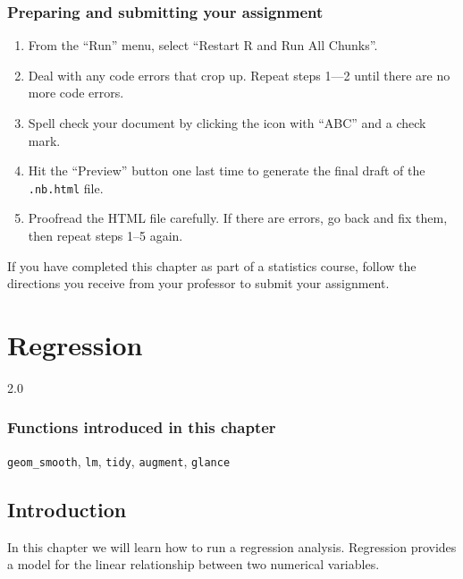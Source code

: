 \documentclass[
]{book}
\providecommand{\tightlist}{%
  \setlength{\itemsep}{0pt}\setlength{\parskip}{0pt}}
\begin{document}
\hypertarget{correlation-prep}{%
\subsection{Preparing and submitting your assignment}\label{correlation-prep}}

\begin{enumerate}
\def\labelenumi{\arabic{enumi}.}
\tightlist
\item
  From the ``Run'' menu, select ``Restart R and Run All Chunks''.
\item
  Deal with any code errors that crop up. Repeat steps 1---2 until there are no more code errors.
\item
  Spell check your document by clicking the icon with ``ABC'' and a check mark.
\item
  Hit the ``Preview'' button one last time to generate the final draft of the \texttt{.nb.html} file.
\item
  Proofread the HTML file carefully. If there are errors, go back and fix them, then repeat steps 1--5 again.
\end{enumerate}

If you have completed this chapter as part of a statistics course, follow the directions you receive from your professor to submit your assignment.

\hypertarget{regression}{%
\chapter{Regression}\label{regression}}

2.0

\hypertarget{functions-introduced-in-this-chapter-6}{%
\subsection*{Functions introduced in this chapter}\label{functions-introduced-in-this-chapter-6}}

\texttt{geom\_smooth}, \texttt{lm}, \texttt{tidy}, \texttt{augment}, \texttt{glance}

\hypertarget{regression-intro}{%
\section{Introduction}\label{regression-intro}}

In this chapter we will learn how to run a regression analysis. Regression provides a model for the linear relationship between two numerical variables.
\end{document}
